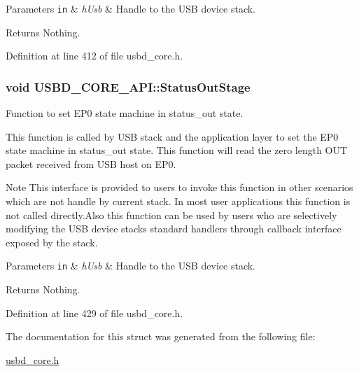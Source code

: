 \begin{DoxyParams}[1]{Parameters}
\mbox{\tt in}  & {\em h\+Usb} & Handle to the U\+SB device stack. \\
\hline
\end{DoxyParams}
\begin{DoxyReturn}{Returns}
Nothing. 
\end{DoxyReturn}


Definition at line 412 of file usbd\+\_\+core.\+h.

\subsubsection[{\texorpdfstring{Status\+Out\+Stage}{StatusOutStage}}]{\setlength{\rightskip}{0pt plus 5cm}void U\+S\+B\+D\+\_\+\+C\+O\+R\+E\+\_\+\+A\+P\+I\+::\+Status\+Out\+Stage}\hypertarget{structUSBD__CORE__API_aefbfebfc97c53ff2d5030fdd44dbec7e}{}\label{structUSBD__CORE__API_aefbfebfc97c53ff2d5030fdd44dbec7e}
Function to set E\+P0 state machine in status\+\_\+out state.

This function is called by U\+SB stack and the application layer to set the E\+P0 state machine in status\+\_\+out state. This function will read the zero length O\+UT packet received from U\+SB host on E\+P0. ~\newline
\begin{DoxyNote}{Note}
This interface is provided to users to invoke this function in other scenarios which are not handle by current stack. In most user applications this function is not called directly.\+Also this function can be used by users who are selectively modifying the U\+SB device stack\textquotesingle{}s standard handlers through callback interface exposed by the stack.
\end{DoxyNote}

\begin{DoxyParams}[1]{Parameters}
\mbox{\tt in}  & {\em h\+Usb} & Handle to the U\+SB device stack. \\
\hline
\end{DoxyParams}
\begin{DoxyReturn}{Returns}
Nothing. 
\end{DoxyReturn}


Definition at line 429 of file usbd\+\_\+core.\+h.



The documentation for this struct was generated from the following file\+:\begin{DoxyCompactItemize}
\item 
\hyperlink{usbd__core_8h}{usbd\+\_\+core.\+h}\end{DoxyCompactItemize}
